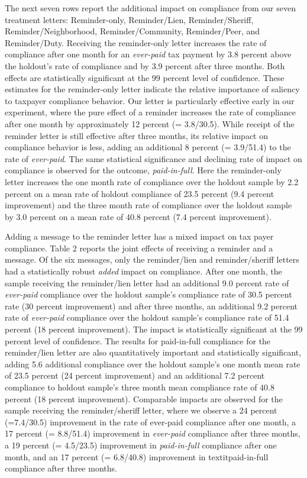 \documentclass[12pt]{article}
\begin{document}
The next seven rows report the additional impact on compliance from
our seven treatment letters: Reminder-only, Reminder/Lien,
Reminder/Sheriff, Reminder/Neighborhood, Reminder/Community,
Reminder/Peer, and Reminder/Duty.  Receiving the reminder-only letter
increases the rate of compliance after one month for an
\textit{ever-paid} tax payment by 3.8 percent above the holdout's rate
of compliance and by 3.9 percent after three months.  Both effects are
statistically significant at the 99 percent level of confidence.
These estimates for the reminder-only letter indicate the relative
importance of saliency to taxpayer compliance behavior.  Our letter
is particularly effective early in our experiment, where the pure
effect of a reminder increases the rate of compliance after one month
by approximately 12 percent (= 3.8/30.5).  While receipt of the
reminder letter is still effective after three months, its relative
impact on compliance behavior is less, adding an additional 8 percent
(= 3.9/51.4) to the rate of \textit{ever-paid}.  The same statistical
significance and declining rate of impact on compliance is observed
for the outcome, \textit{paid-in-full}.  Here the reminder-only letter
increases the one month rate of compliance over the holdout sample by
2.2 percent on a mean rate of holdout compliance of 23.5 percent (9.4
percent improvement) and the three month rate of compliance over the
holdout sample by 3.0 percent on a mean rate of 40.8 percent (7.4
percent improvement).

Adding a message to the reminder letter has a mixed impact on tax
payer compliance.  Table 2 reports the joint effects of receiving a
reminder and a message.  Of the six messages, only the reminder/lien
and reminder/sheriff letters had a statistically robust \textit{added} impact
on compliance.  After one month, the sample receiving the
reminder/lien letter had an additional 9.0 percent rate of
\textit{ever-paid} compliance over the holdout sample's compliance
rate of 30.5 percent rate (30 percent improvement) and after three
months, an additional 9.2 percent rate of \textit{ever-paid}
compliance over the holdout sample's compliance rate of 51.4 percent
(18 percent improvement).  The impact is statistically significant at
the 99 percent level of confidence.  The results for paid-in-full
compliance for the reminder/lien letter are also quantitatively
important and statistically significant, adding 5.6 additional
compliance over the holdout sample's one month mean rate of 23.5
percent (24 percent improvement) and an additional 7.2 percent
compliance to holdout sample's three month mean compliance rate of
40.8 percent (18 percent improvement).  Comparable impacts are
observed for the sample receiving the reminder/sheriff letter, where
we observe a 24 percent (=7.4/30.5) improvement in the rate of
ever-paid compliance after one month, a 17 percent (= 8.8/51.4)
improvement in \textit{ever-paid} compliance after three months, a 19
percent (= 4.5/23.5) improvement in \textit{paid-in-full} compliance
after one month, and an 17 percent (= 6.8/40.8) improvement in
textit{paid-in-full} compliance after three months.
\end{document}

